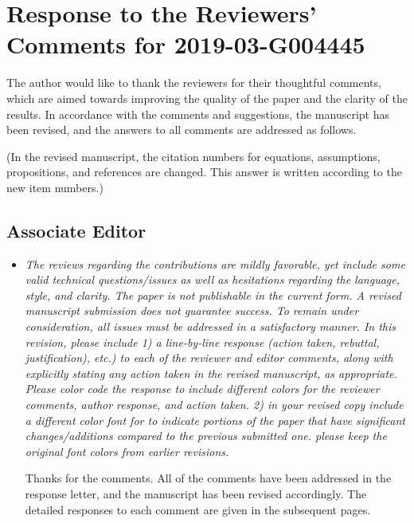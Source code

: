 \documentclass[11pt]{article}
\newcommand{\comment}[1]{\item \itshape #1 \normalfont}
\begin{document}

\section*{Response to the Reviewers' Comments for  2019-03-G004445}

The author would like to thank the reviewers for their thoughtful comments, which are aimed
towards improving the quality of the paper and the clarity of the results. In accordance with the comments and suggestions, the manuscript has been revised, and the answers to all comments are addressed as follows.

(In the revised manuscript, the citation numbers for equations, assumptions, propositions, and references are changed. This answer is written according to the new item numbers.)


\subsection*{Associate Editor}

\setlength{\leftmargini}{0pt}
\begin{itemize}\setlength{\itemsep}{2\parsep}

\comment{The reviews regarding the contributions are mildly favorable, yet include some valid technical questions/issues as well as hesitations regarding the language, style, and clarity. The paper is not publishable in the current form. A revised manuscript submission does not guarantee success. To remain under consideration, all issues must be addressed in a satisfactory manner.   
In this revision, please include 
1) a line-by-line response (action taken, rebuttal, justification), etc.) to each of the reviewer and editor comments, along with explicitly stating any action taken in the revised manuscript, as appropriate.  Please color code the response to include different colors for the reviewer comments, author response, and action taken.  
2) in your revised copy include a different color font for to indicate portions of the paper that have significant changes/additions compared to the previous submitted one.  please keep the original font colors from earlier revisions.
}

Thanks for the comments. All of the comments have been addressed in the response letter, and the manuscript has been revised accordingly. The detailed responses to each comment are given in the subsequent pages.  

\end{itemize}
\end{document}
